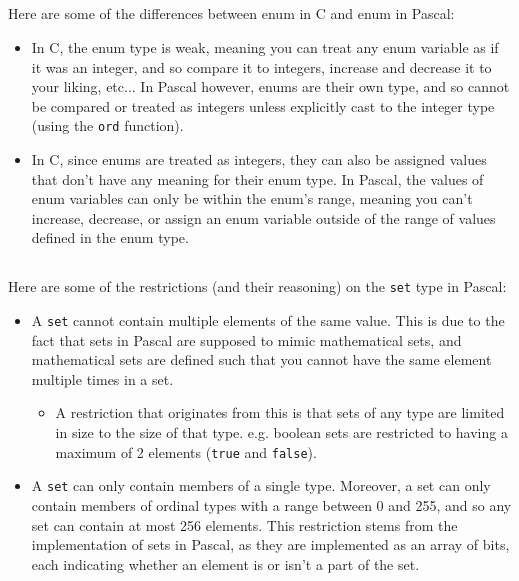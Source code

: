 \documentclass{article}
\begin{document}
\subsection{}
Here are some of the differences between enum in C and enum in Pascal:
\begin{itemize}
    \item In C, the enum type is weak, meaning you can treat any enum variable as if it was an integer, and so compare it to integers, increase and decrease it to your liking, etc... In Pascal however, enums are their own type, and so cannot be compared or treated as integers unless explicitly cast to the integer type (using the \lstinline{ord} function).
    \item In C, since enums are treated as integers, they can also be assigned values that don't have any meaning for their enum type. In Pascal, the values of enum variables can only be within the enum's range, meaning you can't increase, decrease, or assign an enum variable outside of the range of values defined in the enum type.
\end{itemize}

\subsection{}
Here are some of the restrictions (and their reasoning) on the \lstinline{set} type in Pascal:
\begin{itemize}
    \item A \lstinline{set} cannot contain multiple elements of the same value. This is due to the fact that sets in Pascal are supposed to mimic mathematical sets, and mathematical sets are defined such that you cannot have the same element multiple times in a set.
        \begin{itemize}
            \item A restriction that originates from this is that sets of any type are limited in size to the size of that type. e.g. boolean sets are restricted to having a maximum of 2 elements (\lstinline{true} and \lstinline{false}).
        \end{itemize}
    \item A \lstinline{set} can only contain members of a single type. Moreover, a set can only contain members of ordinal types with a range between 0 and 255, and so any set can contain at most 256 elements. This restriction stems from the implementation of sets in Pascal, as they are implemented as an array of bits, each indicating whether an element is or isn't a part of the set.
\end{itemize}
\end{document}

